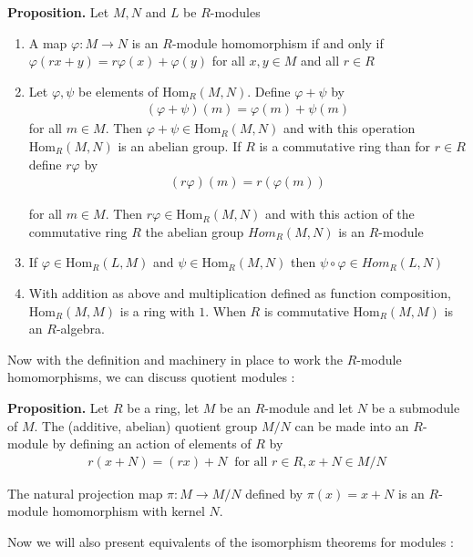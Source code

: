 \documentclass[11pt, reqno]{amsart}
\theoremstyle{plain}
\theoremstyle{definition}
\theoremstyle{example}
\def\Hom{\mathrm{Hom}}
\begin{document}
\par
\textbf{Proposition.} Let $M, N$ and $L$ be $R$-modules
\begin{enumerate}
\item A map $\varphi: M \to N$ is an $R$-module homomorphism if and only if $\varphi(rx + y) =r\varphi(x) + \varphi(y)$ for all $x, y \in M$ and all $r \in R$
\item Let $\varphi, \psi$ be elements of $\Hom_R(M,N)$. Define $\varphi + \psi$ by
\begin{align*}
(\varphi + \psi)(m) = \varphi(m) + \psi(m)
\end{align*}
for all $m \in M$. Then $\varphi + \psi \in \Hom_R(M, N)$ and with this operation $\Hom_R(M, N)$ is an abelian group. If $R$ is a commutative ring than for $r \in R$ define $r\varphi$ by 
\begin{align*}
(r\varphi)(m) = r(\varphi(m))
\end{align*}

for all $m \in M$. Then $r\varphi \in \Hom_R(M, N)$ and with this action of the commutative ring $R$ the abelian group $Hom_R(M, N)$ is an $R$-module
\item If $\varphi \in \Hom_R(L, M)$ and $\psi \in \Hom_R(M, N)$ then $\psi \circ \varphi \in Hom_R(L, N)$
\item With addition as above and multiplication defined as function composition, $\Hom_R(M, M)$ is a ring with $1$. When $R$ is commutative $\Hom_R(M, M)$ is an $R$-algebra.
\end{enumerate}

Now with the definition and machinery in place to work the $R$-module homomorphisms, we can discuss quotient modules \cite[\S 10.2, p. 348]{dummit}:

\par
\textbf{Proposition.} Let $R$ be a ring, let $M$ be an $R$-module and let $N$ be a submodule of $M$. The (additive, abelian) quotient group $M/N$ can be made into an $R$-module by defining an action of elements of $R$ by
\begin{align*}
r(x+N) = (rx) + N \; \; \text{for all } r \in R, x+N \in M/N
\end{align*}

The natural projection map $\pi: M \to M/N$ defined by $\pi(x) = x + N$ is an $R$-module homomorphism with kernel $N$.

\par
Now we will also present equivalents of the isomorphism theorems for modules \cite[\S 10.2, p. 345]{dummit}:
\end{document}
